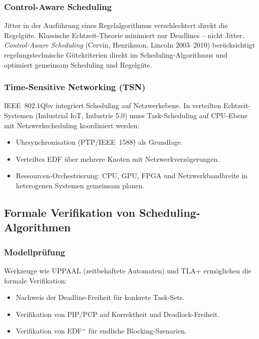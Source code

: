 ﻿\documentclass[a4paper,12pt]{report}
\theoremstyle{definition}
\begin{document}
\subsubsection{Control-Aware Scheduling}

Jitter in der Ausführung eines Regelalgorithmus verschlechtert direkt die
Regelgüte. Klassische Echtzeit-Theorie minimiert nur Deadlines -- nicht
Jitter. \emph{Control-Aware Scheduling} (Cervin, Henriksson, Lincoln 2003--2010)
berücksichtigt regelungstechnische Gütekriterien direkt im Scheduling-Algorithmus
und optimiert gemeinsam Scheduling und Regelgüte.

\subsubsection{Time-Sensitive Networking (TSN)}

IEEE~802.1Qbv integriert Scheduling auf Netzwerkebene. In verteilten
Echtzeit-Systemen (Industrial IoT, Industrie 5.0) muss Task-Scheduling auf
CPU-Ebene mit Netzwerkscheduling koordiniert werden:
\begin{itemize}
	\item Uhrsynchronisation (PTP/IEEE~1588) als Grundlage.
	\item Verteiltes EDF über mehrere Knoten mit Netzwerkverzögerungen.
	\item Ressourcen-Orchestrierung: CPU, GPU, FPGA und Netzwerkbandbreite
	      in heterogenen Systemen gemeinsam planen.
\end{itemize}

\subsection{Formale Verifikation von Scheduling-Algorithmen}

\subsubsection{Modellprüfung}

Werkzeuge wie UPPAAL (zeitbehaftete Automaten) und TLA+ ermöglichen die
formale Verifikation:
\begin{itemize}
	\item Nachweis der Deadline-Freiheit für konkrete Task-Sets.
	\item Verifikation von PIP/PCP auf Korrektheit und Deadlock-Freiheit.
	\item Verifikation von EDF$^+$ für endliche Blocking-Szenarien.
\end{itemize}
\end{document}
